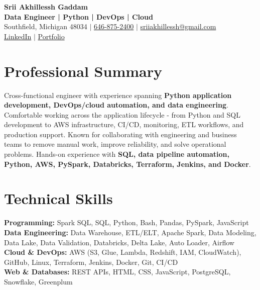 \documentclass[letterpaper,10pt]{article}
\begin{document}
\fontsize{9.35pt}{10.45pt}\selectfont

\begin{center}
    {\LARGE \textbf{Srii Akhillessh Gaddam}} \\[-1pt]
    \textbf{Data Engineer | Python | DevOps | Cloud} \\[2pt]
    Southfield, Michigan 48034 $|$
    \href{tel:6468752400}{646-875-2400} $|$
    \href{mailto:sriiakhillessh@gmail.com}{sriiakhillessh@gmail.com} \\[1pt]
    \href{https://www.linkedin.com/in/srii-akhiilessh-gaddam-b48668191/}{LinkedIn} $|$
    \href{https://sriiakhillesshg.github.io/portfolio/}{Portfolio}
\end{center}
\vspace{-8pt}

\section{Professional Summary}
\small{Cross-functional engineer with experience spanning \textbf{Python application development, DevOps/cloud automation, and data engineering}. Comfortable working across the application lifecycle - from Python and SQL development to AWS infrastructure, CI/CD, monitoring, ETL workflows, and production support. Known for collaborating with engineering and business teams to remove manual work, improve reliability, and solve operational problems. Hands-on experience with \textbf{SQL, data pipeline automation, Python, AWS, PySpark, Databricks, Terraform, Jenkins, and Docker}.}

\section{Technical Skills}
\small{
\textbf{Programming:} Spark SQL, SQL, Python, Bash, Pandas, PySpark, JavaScript \\
\textbf{Data Engineering:} Data Warehouse, ETL/ELT, Apache Spark, Data Modeling, Data Lake, Data Validation, Databricks, Delta Lake, Auto Loader, Airflow \\
\textbf{Cloud \& DevOps:} AWS (S3, Glue, Lambda, Redshift, IAM, CloudWatch), GitHub, Linux, Terraform, Jenkins, Docker, Git, CI/CD \\
\textbf{Web \& Databases:} REST APIs, HTML, CSS, JavaScript, PostgreSQL, Snowflake, Greenplum
}
\end{document}
